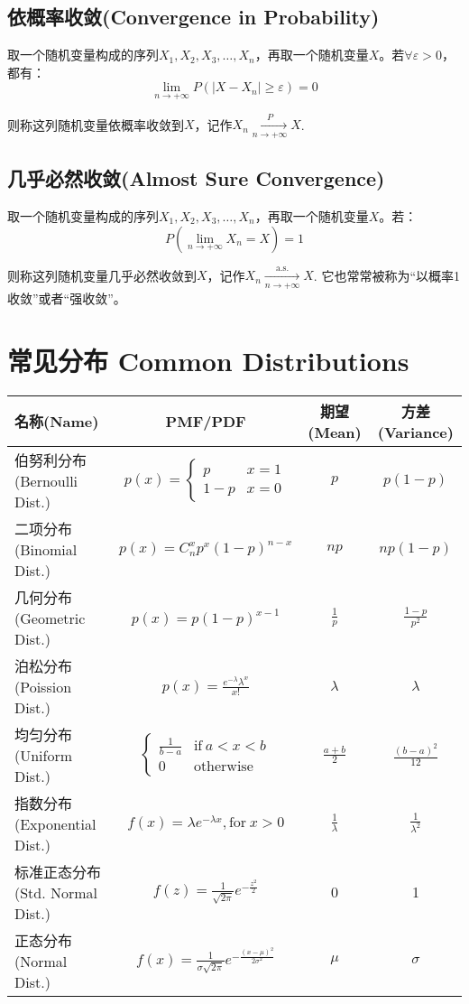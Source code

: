 \documentclass[UTF8]{ctexbook}
\begin{document}
\subsection{依概率收敛(Convergence in Probability)}
\label{convg-in-prob}
取一个随机变量构成的序列$X_1,X_2,X_3,\dots,X_n$，再取一个随机变量$X$。若$\forall\varepsilon>0$，都有：
\[
	\lim_{n\to+\infty}P(|X-X_n|\geq\varepsilon)=0
\]

则称这列随机变量依概率收敛到$X$，记作$X_n\xrightarrow[n\to+\infty]{P}X$.
\subsection{几乎必然收敛(Almost Sure Convergence)}
取一个随机变量构成的序列$X_1,X_2,X_3,\dots,X_n$，再取一个随机变量$X$。若：
\[
	P(\lim_{n\to+\infty}X_n=X)=1
\]

则称这列随机变量几乎必然收敛到$X$，记作$X_n\xrightarrow[n\to+\infty]{\mathrm{a.s.}}X$. 它也常常被称为“以概率1收敛”或者“强收敛”。

\section{常见分布 Common Distributions}
\renewcommand{\arraystretch}{2.1}
\begin{center}
    \begin{tabular}{|l|c|c|c|}
\hline\hline
     名称(Name)&PMF/PDF&期望(Mean)&方差(Variance) \\ \hline
     伯努利分布(Bernoulli Dist.)& $p(x)=\begin{cases} p &x=1 \\ 1-p &x=0 \end{cases}$& $p$& $p(1-p)$ \\ \hline
     二项分布(Binomial Dist.)& $p(x)=C_n^xp^x(1-p)^{n-x}$& $np$& $np(1-p)$ \\ \hline
     几何分布(Geometric Dist.)& $p(x)=p(1-p)^{x-1}$& $\frac{1}{p}$& $\frac{1-p}{p^2}$ \\ \hline
     泊松分布(Poission Dist.)& $p(x)=\frac{e^{-\lambda}\lambda^x}{x!}$& $\lambda$& $\lambda$ \\ \hline
     均匀分布(Uniform Dist.)& $\begin{cases} \frac{1}{b-a} &\text{if}\ a<x<b \\ 0 &\text{otherwise} \end{cases}$& $\frac{a+b}{2}$& $\frac{(b-a)^2}{12}$ \\ \hline
     指数分布(Exponential Dist.)& $f(x)=\lambda e^{-\lambda x}, \text{for}\ x>0$& $\frac{1}{\lambda}$& $\frac{1}{\lambda^2}$ \\ \hline
     标准正态分布(Std. Normal Dist.)& $f(z)=\frac{1}{\sqrt{2\pi}}e^{-\frac{z^2}{2}}$& 0& 1\\ \hline
     正态分布(Normal Dist.)&$f(x)=\frac{1}{\sigma\sqrt{2\pi}}e^{-\frac{(x-\mu)^2}{2\sigma^2}}$& $\mu$& $\sigma$\\ \hline
\hline
\end{tabular}
\end{center}
\renewcommand{\arraystretch}{1}
\end{document}

